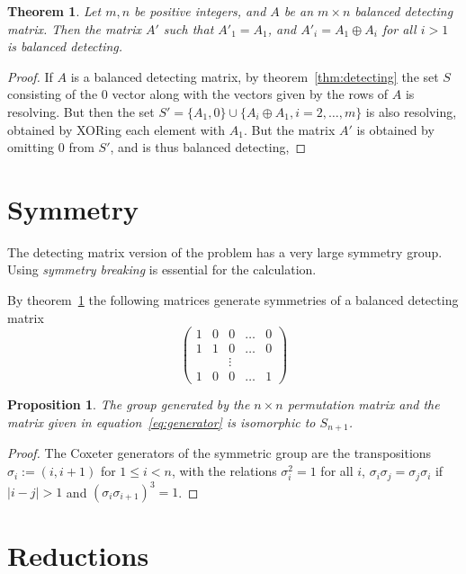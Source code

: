 \documentclass{article}
\renewcommand{\eqref}[1]{equation~\ref{eq:#1}}
\newcommand{\thmref}[1]{theorem~\ref{thm:#1}}
\newtheorem{proposition}{Proposition}
\newtheorem{theorem}{Theorem}
\begin{document}
\begin{theorem}
\label{thm:symmetry}
  Let $m,n$ be positive integers, and $A$ be an $m \times n$ balanced
  detecting matrix.  Then the matrix $A'$ such that $A'_1 = A_1$, and
  $A'_i = A_1 \oplus A_i$ for all $i > 1$ is balanced detecting.
\end{theorem}
\begin{proof}
  If $A$ is a balanced detecting matrix, by \thmref{detecting} the set
  $S$ consisting of the $0$ vector along with the vectors given by the
  rows of $A$ is resolving.  But then the set $S' = \{ A_1, 0 \} \cup \{
  A_i \oplus A_1, i=2,\dots, m\}$ is also resolving, obtained by
  XORing each element with $A_1$.  But the matrix $A'$ is obtained by
  omitting $0$ from $S'$, and is thus balanced detecting,
\end{proof}
\section{Symmetry}
\label{sec:symmetry}

The detecting matrix version of the problem has a very large symmetry
group. Using \emph{symmetry breaking} is essential for the
calculation.

By \thmref{symmetry} the following matrices generate symmetries of a
balanced detecting matrix
\begin{equation}
  \label{eq:generator}
  \begin{pmatrix}
    1 & 0 & 0 & \dots & 0 \\
    1 & 1 & 0 & \dots & 0 \\
    & & \vdots \\
    1 & 0 & 0 & \dots & 1
  \end{pmatrix}
\end{equation}

\begin{proposition}
  The group generated by the $n \times n$ permutation matrix and the
  matrix given in \eqref{generator} is isomorphic to $S_{n+1}$.
\end{proposition}
\begin{proof}
  The Coxeter generators of the symmetric group are the transpositions
  $\sigma_i := (i, i+1)$ for $1 \le i < n$, with the relations
  $\sigma_i^2 = 1$ for all $i$, $\sigma_i \sigma_j = \sigma_j
  \sigma_i$ if $|i-j| > 1$ and $(\sigma_i \sigma_{i+1})^3 = 1$.
\end{proof}

\section{Reductions}
\label{sec:reductions}
\end{document}
